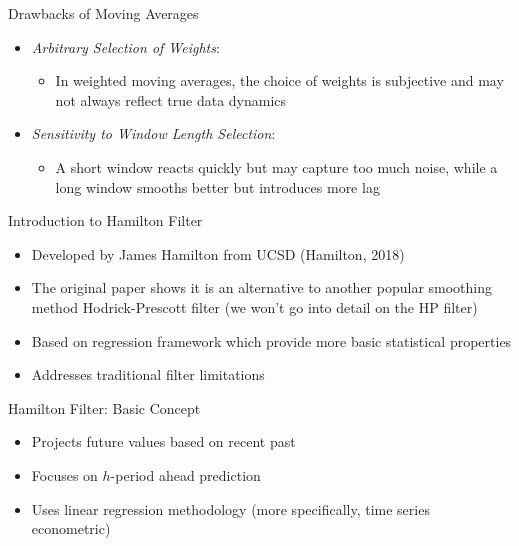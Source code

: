 \documentclass[aspectratio=1610]{beamer}
\begin{document}
\begin{frame}[wide]{Drawbacks of Moving Averages}
	\begin{itemize}
		\item \textit{Arbitrary Selection of Weights}:
		\vspace{1mm}
		\begin{itemize}
			\item In weighted moving averages, the choice of weights is subjective and may not always reflect true data dynamics
		\end{itemize}
		\item \textit{Sensitivity to Window Length Selection}: 
		\vspace{1mm}
		\begin{itemize}
			\item A short window reacts quickly but may capture too much noise, while a long window smooths better but introduces more lag
		\end{itemize}
	\end{itemize}
\end{frame}

\begin{frame}[wide]{Introduction to Hamilton Filter}
	\begin{itemize}
		\item Developed by James Hamilton from UCSD (Hamilton, 2018)
		\item The original paper shows it is an alternative to another popular smoothing method Hodrick-Prescott filter (we won't go into detail on the HP filter)
		\item Based on regression framework which provide more basic statistical properties
		\item Addresses traditional filter limitations
	\end{itemize}
\end{frame}

\begin{frame}[wide]{Hamilton Filter: Basic Concept}
	\begin{itemize}
		\item Projects future values based on recent past
		\item Focuses on $h$-period ahead prediction
		\item Uses linear regression methodology (more specifically, time series econometric)
	\end{itemize}
\end{frame}
\end{document}
